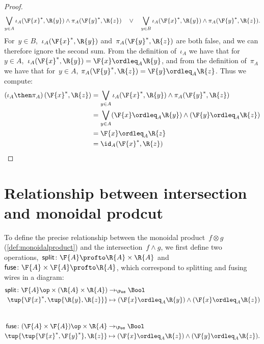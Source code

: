 \begin{proof}
\begin{equation}
    \bigvee_{y \in A} \iota_A(\F{x}^*,\R{y}) \wedge \pi_A(\F{y}^*,\R{z}) \quad\vee\quad
    \bigvee_{y \in B} \iota_A(\F{x}^*,\R{y}) \wedge \pi_A(\F{y}^*,\R{z}).
  \end{equation}
  For~$y \in B$,~$\iota_A(\F{x}^*,\R{y})$ and~$\pi_A(\F{y}^*,\R{z})$ are both false, and we can therefore ignore the second sum.
  From the definition of~$\iota_A$ we have that for~$y\in A$,~$ \iota_A(\F{x}^*,\R{y})=\F{x} \ordleq_A \R{y}$, and from the definition of~$\pi_A$ we have that for~$y\in A$, $\pi_A(\F{y}^*,\R{z})=\F{y} \ordleq_A \R{z}$. Thus we compute:
  \begin{equation}
    \begin{aligned}
      \left(\iota_A\then \pi_A\right)(\F{x}^*, \R{z}) &= \bigvee_{y \in A} \iota_A(\F{x}^*,\R{y}) \wedge \pi_A(\F{y}^*,\R{z})  \\
      &= \bigvee_{y \in A} (\F{x} \ordleq_A \R{y}) \wedge  (\F{y} \ordleq_A \R{z}) \\
      &= \F{x} \ordleq_A \R{z}\\
      &= \id_A(\F{x}^*, \R{z})
    \end{aligned}
  \end{equation}
\end{proof}

\section{Relationship between intersection and monoidal prodcut}
To define the precise relationship between the monoidal product~$f \otimes g$ (\cref{def:monoidalproduct}) and the intersection~$f \wedge g$, we first define two operations,~$\mathsf{split} \colon \F{A} \profto \R{A} \times \R{A}$ and~$\mathsf{fuse} \colon \F{A} \times \F{A} \profto \R{A}$, which correspond to splitting and fusing wires in a diagram:
\begin{equation}
  \begin{aligned}
    \mathsf{split} \colon \F{A}\op \times (\R{A} \times \R{A}) &\to_\Pos \Bool \\
    \tup{\F{x}^*, \tup{\R{y}, \R{z}}} &\mapsto (\F{x} \ordleq_A \R{y}) \wedge (\F{x} \ordleq_A \R{z})
  \end{aligned}
\end{equation}
~
\begin{equation}
  \begin{aligned}
    \mathsf{fuse} \colon (\F{A} \times \F{A})\op \times \R{A} &\to_\Pos \Bool \\
    \tup{ \tup{\F{x}^*, \F{y}^*}, \R{z}} &\mapsto (\F{x} \ordleq_A \R{z}) \wedge (\F{y} \ordleq_A \R{z}).
  \end{aligned}
\end{equation}

